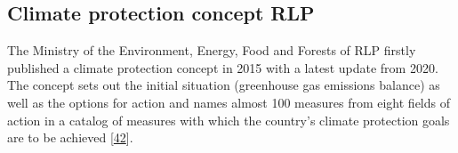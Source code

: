 \documentclass[a4paper,11pt]{article}
\begin{document}
\hypertarget{climate-protection-concept-rlp}{%
\subsection{Climate protection concept RLP}\label{climate-protection-concept-rlp}}

The Ministry of the Environment, Energy, Food and Forests of RLP firstly published a climate protection concept in
2015 with a latest update from 2020. The concept sets out the initial situation (greenhouse gas emissions balance) as well as the options for action and names almost 100 measures from eight fields of action in a catalog of measures with which the country's climate protection goals are to be achieved {[}\protect\hyperlink{ref-MinisteriumfurUmweltEnergieErnahrungundForsten.2020b}{42}{]}.
\end{document}
